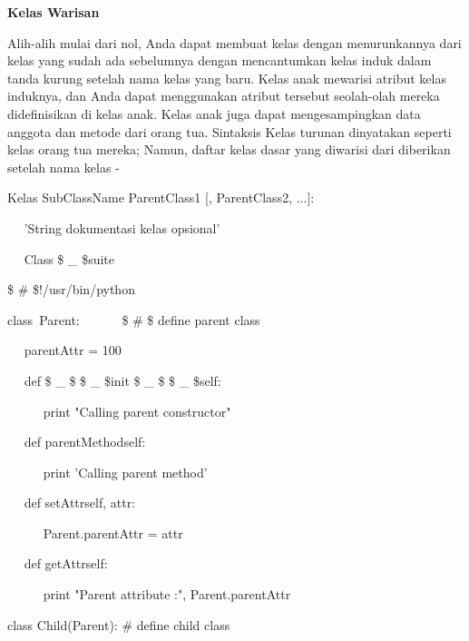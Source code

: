 \begin{12pt}
\begin{12pt}
\begin{12pt}
\begin{12pt}
\begin{12pt}
\begin{12pt}
\begin{12pt}
\begin{12pt}
\begin{12pt}
\begin{12pt}
\begin{12pt}
\begin{12pt}
\begin{12pt}
\begin{12pt}
\begin{12pt}
\begin{12pt}
\vspace{12pt}
\vspace{12pt}
\noindent 
{\fontsize{14pt}{14pt}\selectfont \textbf{Kelas Warisan} \\} \par
\begin{12pt}
Alih-alih mulai dari nol, Anda dapat membuat kelas dengan menurunkannya dari kelas yang sudah ada sebelumnya dengan mencantumkan kelas induk dalam tanda kurung setelah nama kelas yang baru. Kelas anak mewarisi atribut kelas induknya, dan Anda dapat menggunakan atribut tersebut seolah-olah mereka didefinisikan di kelas anak. Kelas anak juga dapat mengesampingkan data anggota dan metode dari orang tua. Sintaksis Kelas turunan dinyatakan seperti kelas orang tua mereka; Namun, daftar kelas dasar yang diwarisi dari diberikan setelah nama kelas - \par
\vspace{12pt}
\noindent 
Kelas SubClassName {ParentClass1 [, ParentClass2, ...]}: \par
\noindent 
~~ 'String dokumentasi kelas opsional' \par
\noindent 
~~ Class \$  \_  \$suite \par
\noindent 
 \$  \#  \$!/usr/bin/python \par
\vspace{12pt}
\noindent 
class~Parent:~~~~~~   \$  \#  \$ define parent class \par
\noindent 
~~ parentAttr = 100 \par
\noindent 
~~ def  \$  \_  \$ \$  \_  \$init \$  \_  \$ \$  \_  \${self}: \par
\noindent 
~~~~~ print "Calling parent constructor" \par
\vspace{12pt}
\noindent 
~~ def parentMethod{self}: \par
\noindent 
~~~~~ print 'Calling parent method' \par
\begin{12pt}
\noindent 
~~ def setAttr{self, attr}: \par
\noindent 
~~~~~ Parent.parentAttr = attr \par
\begin{12pt}
\noindent 
~~ def getAttr{self}: \par
\noindent 
~~~~~ print "Parent attribute :", Parent.parentAttr \par
\vspace{12pt}
\noindent 
class Child(Parent):  $  \#  $ define child class \par

\end{12pt}
\end{12pt}
\end{12pt}
\end{12pt}
\end{12pt}
\end{12pt}
\end{12pt}
\end{12pt}
\end{12pt}
\end{12pt}
\end{12pt}
\end{12pt}
\end{12pt}
\end{12pt}
\end{12pt}
\end{12pt}
\end{12pt}
\end{12pt}
\end{12pt}
